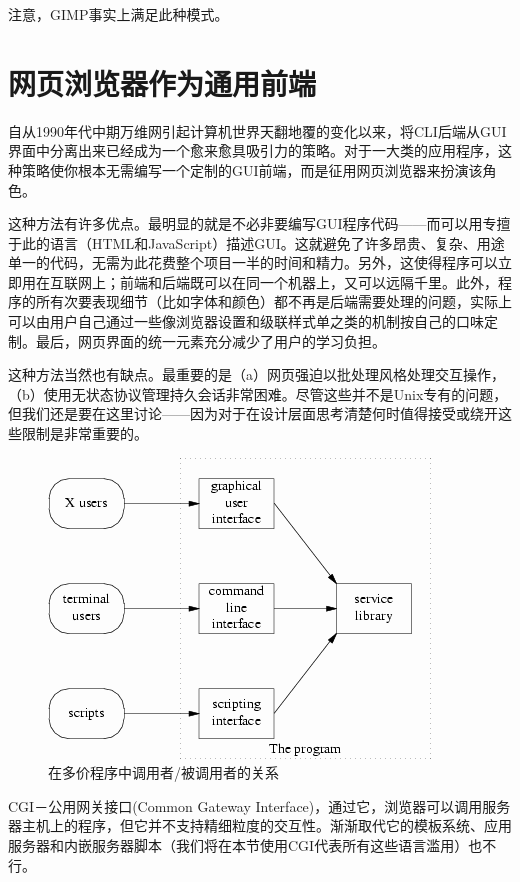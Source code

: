 \documentclass[12pt,oneside]{book}
\begin{document}
注意，GIMP事实上满足此种模式。

\section{网页浏览器作为通用前端}
自从1990年代中期万维网引起计算机世界天翻地覆的变化以来，将CLI后端从GUI界面中分离出来已经成为一个愈来愈具吸引力的策略。对于一大类的应用程序，这种策略使你根本无需编写一个定制的GUI前端，而是征用网页浏览器来扮演该角色。

这种方法有许多优点。最明显的就是不必非要编写GUI程序代码——而可以用专擅于此的语言（HTML和JavaScript）描述GUI。这就避免了许多昂贵、复杂、用途单一的代码，无需为此花费整个项目一半的时间和精力。另外，这使得程序可以立即用在互联网上；前端和后端既可以在同一个机器上，又可以远隔千里。此外，程序的所有次要表现细节（比如字体和颜色）都不再是后端需要处理的问题，实际上可以由用户自己通过一些像浏览器设置和级联样式单之类的机制按自己的口味定制。最后，网页界面的统一元素充分减少了用户的学习负担。

这种方法当然也有缺点。最重要的是（a）网页强迫以批处理风格处理交互操作，（b）使用无状态协议管理持久会话非常困难。尽管这些并不是Unix专有的问题，但我们还是要在这里讨论——因为对于在设计层面思考清楚何时值得接受或绕开这些限制是非常重要的。

\begin{figure}[H]
\centering
\includegraphics[scale=1 , keepaspectratio]{polyvalent.png}
\caption{在多价程序中调用者/被调用者的关系}
\end{figure}


CGI－公用网关接口(Common Gateway Interface)，通过它，浏览器可以调用服务器主机上的程序，但它并不支持精细粒度的交互性。渐渐取代它的模板系统、应用服务器和内嵌服务器脚本（我们将在本节使用CGI代表所有这些语言滥用）也不行。
\end{document}
